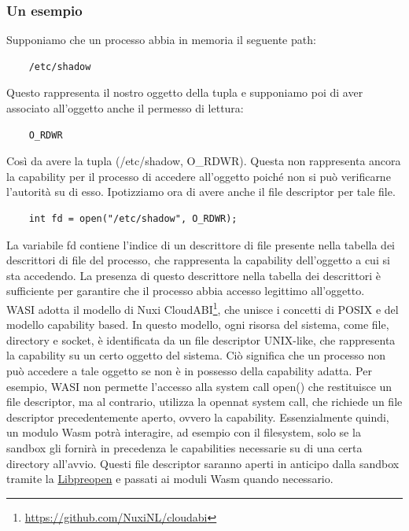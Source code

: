 \subsubsection{Un esempio}
Supponiamo che un processo abbia in memoria il seguente path:
\begin{lstlisting}
    /etc/shadow
\end{lstlisting}
Questo rappresenta il nostro oggetto della tupla e supponiamo poi di aver associato all'oggetto anche il permesso di
lettura: 
\begin{lstlisting}
    O_RDWR
\end{lstlisting}
Così da avere la tupla (/etc/shadow, O\_RDWR). Questa non rappresenta ancora la capability per il processo di accedere
all'oggetto poiché non si può verificarne l'autorità su di esso. Ipotizziamo ora di avere anche il file descriptor per
tale file.
\begin{lstlisting}
    int fd = open("/etc/shadow", O_RDWR);
\end{lstlisting}
La variabile fd contiene l'indice di un descrittore di file presente nella tabella dei descrittori di file del processo,
che rappresenta la capability dell'oggetto a cui si sta accedendo. La presenza di questo descrittore nella tabella dei
descrittori è sufficiente per garantire che il processo abbia accesso legittimo all'oggetto. \\

WASI adotta il modello di Nuxi CloudABI\footnote{\url{https://github.com/NuxiNL/cloudabi}}, che unisce i concetti di
POSIX e del modello capability based. In questo modello, ogni risorsa del sistema, come file, directory e socket, è
identificata da un file descriptor UNIX-like, che rappresenta la capability su un certo oggetto del sistema. Ciò
significa che un processo non può accedere a tale oggetto se non è in possesso della capability adatta. Per esempio,
WASI non permette l'accesso alla system call open() che restituisce un file descriptor, ma al contrario, utilizza la
opennat system call, che richiede un file descriptor precedentemente aperto, ovvero la capability. Essenzialmente
quindi, un modulo Wasm potrà interagire, ad esempio con il filesystem, solo se la sandbox gli fornirà in precedenza le
capabilities necessarie su di una certa directory all'avvio. Questi file descriptor saranno aperti in anticipo dalla
sandbox tramite la \hyperref[sec:libpreopen]{Libpreopen} e passati ai moduli Wasm quando necessario.
